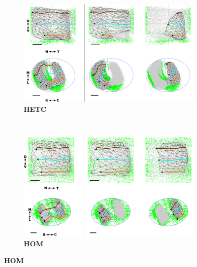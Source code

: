 \begin{landscape}
\begin{figure}[h!]
	\begin{subfigure}{0.75\textwidth}
		\centering
		\includegraphics[width=\textwidth]{images/lattice/figHETC2}
		\caption{\textbf{HETC}}
	\end{subfigure}
	~
	\begin{subfigure}{0.75\textwidth}
		\centering
		\includegraphics[width=\textwidth]{images/lattice/figHOM2}
		\caption{\textbf{HOM}}
	\end{subfigure}
\end{figure}
\end{landscape}
\addtocounter{figure}{-1}

